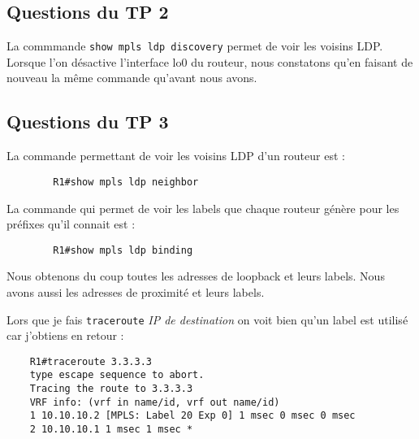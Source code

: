 \documentclass[12pt, a4paper]{article}
\begin{document}
\subsection{Questions du TP 2}
La commmande \texttt{show mpls ldp discovery} permet de voir les voisins LDP. 
Lorsque l'on désactive l'interface lo0 du routeur, nous constatons qu'en faisant
de nouveau la même commande qu'avant nous avons. 

\newpage

\subsection{Questions du TP 3}
La commande permettant de voir les voisins LDP d'un routeur est :
    \begin{verbatim}
        R1#show mpls ldp neighbor
    \end{verbatim}

La commande qui permet de voir les labels que chaque routeur génère pour 
les préfixes qu’il connait est : 
    \begin{verbatim}
        R1#show mpls ldp binding
    \end{verbatim}
Nous obtenons du coup toutes les adresses de loopback et leurs labels.
Nous avons aussi les adresses de proximité et leurs labels.



Lors que je fais \texttt{traceroute} \textit{IP de destination} on voit bien
qu'un label est utilisé car j'obtiens en retour : 
\begin{verbatim}
    R1#traceroute 3.3.3.3
    type escape sequence to abort.
    Tracing the route to 3.3.3.3
    VRF info: (vrf in name/id, vrf out name/id)
    1 10.10.10.2 [MPLS: Label 20 Exp 0] 1 msec 0 msec 0 msec
    2 10.10.10.1 1 msec 1 msec *
\end{verbatim}
\end{document}
